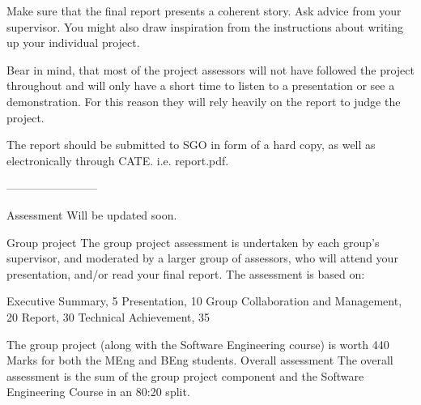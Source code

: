 \documentclass[a4paper, 11pt]{article}
\begin{document}
  Make sure that the final report presents a coherent story. Ask advice from
  your supervisor. You might also draw inspiration from the instructions about
  writing up your individual project.

  Bear in mind, that most of the project assessors will not have followed the
  project throughout and will only have a short time to listen to a
  presentation or see a demonstration. For this reason they will rely heavily
  on the report to judge the project.

  The report should be submitted to SGO in form of a hard copy, as well as
  electronically through CATE. i.e. report.pdf. 

  ------------------------

  Assessment
  Will be updated soon.

  Group project
  The group project assessment is undertaken by each group's supervisor, and
  moderated by a larger group of assessors, who will attend your presentation,
  and/or read your final report. The assessment is based on:

      Executive Summary, 5
      Presentation, 10
      Group Collaboration and Management, 20
      Report, 30
      Technical Achievement, 35

  The group project (along with the Software Engineering course) is worth 440
  Marks for both the MEng and BEng students.
  Overall assessment
  The overall assessment is the sum of the group project component and the
  Software Engineering Course in an 80:20 split.
\end{document}
